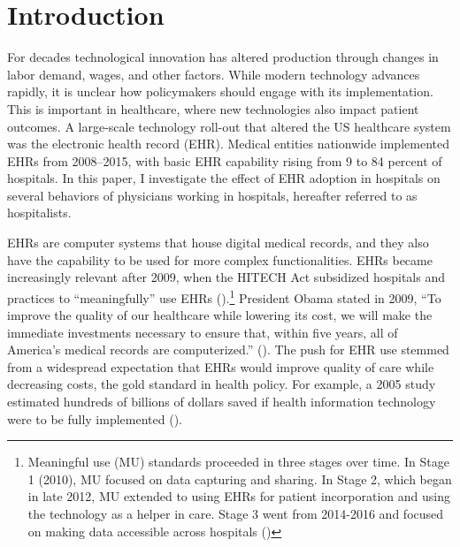 \documentclass[12pt]{article}
\begin{document}
	
	\onehalfspacing
	
	\newpage

\section{Introduction}

For decades technological innovation has altered production through changes in labor demand, wages, and other factors. While modern technology advances rapidly, it is unclear how policymakers should engage with its implementation. This is important in healthcare, where new technologies also impact patient outcomes. A large-scale technology roll-out that altered the US healthcare system was the electronic health record (EHR). Medical entities nationwide implemented EHRs from 2008–2015, with basic EHR capability rising from 9 to 84 percent of hospitals. In this paper, I investigate the effect of EHR adoption in hospitals on several behaviors of physicians working in hospitals, hereafter referred to as hospitalists. 

EHRs are computer systems that house digital medical records, and they also have the capability to be used for more complex functionalities. EHRs became increasingly relevant after 2009, when the HITECH Act subsidized hospitals and practices to ``meaningfully'' use EHRs (\cite{hitech}).\footnote{Meaningful use (MU) standards proceeded in three stages over time. In Stage 1 (2010), MU focused on data capturing and sharing. In Stage 2, which began in late 2012, MU extended to using EHRs for patient incorporation and using the technology as a helper in care. Stage 3 went from 2014-2016 and focused on making data accessible across hospitals (\cite{meanuse})} President Obama stated in 2009, “To improve the quality of our healthcare while lowering its cost, we will make the immediate investments necessary to ensure that, within five years, all of America’s medical records are computerized.” (\cite{presquote}). The push for EHR use stemmed from a widespread expectation that EHRs would improve quality of care while decreasing costs, the gold standard in health policy. For example, a 2005 study estimated hundreds of billions of dollars saved if health information technology were to be fully implemented (\cite{hillestad2005}).
\end{document}
